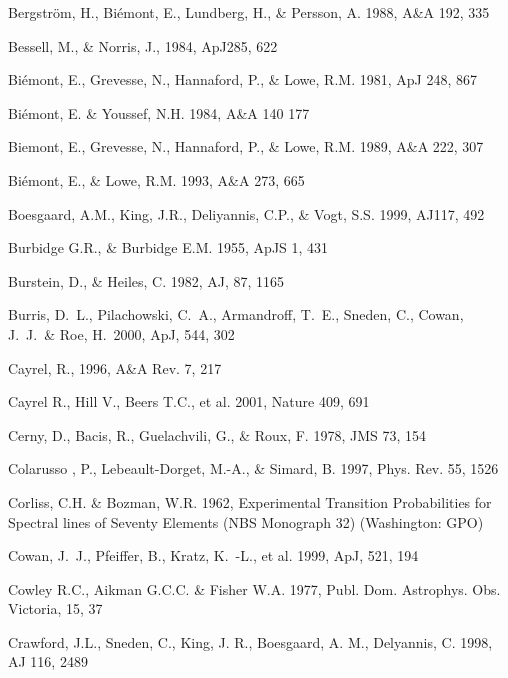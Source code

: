 \documentclass{aa}
\begin{document}
\begin{thebibliography}{}
     Bergstr\"om, H., Bi\'emont, E.,
Lundberg, H., \& Persson, A. 1988, A\&A 192, 335

    Bessell, M., \& Norris, J., 1984, ApJ285, 622

     Bi\'emont, E., Grevesse, N., Hannaford,
P., \& Lowe, R.M. 1981, ApJ 248, 867 

     Bi\'emont, E. \& Youssef, N.H. 1984, A\&A 140 177

     Biemont, E., Grevesse, N., Hannaford,
    P., \& Lowe, R.M. 1989, A\&A 222, 307 

     Bi\'emont, E., \& Lowe, R.M. 1993, A\&A 273, 665

    Boesgaard, A.M., King, J.R.,
   Deliyannis, C.P., \& Vogt, S.S. 1999, AJ117, 492

    Burbidge G.R., \& Burbidge  E.M. 1955, 
ApJS 1, 431 

     Burstein, D., \& Heiles, C. 1982, AJ, 87, 1165

     Burris, D.\ L.,
Pilachowski, C.\ A., Armandroff, T.\ E., Sneden, C., Cowan, J.\ J.\ \& Roe,
H.\ 2000, ApJ, 544, 302

     Cayrel, R., 1996, A\&A Rev. 7, 217

Cayrel R., Hill V., Beers T.C., et al. 2001, Nature 409, 691

    Cerny, D., Bacis, R., Guelachvili, G., \& Roux, F.
1978, JMS 73, 154

    Colarusso , P., Lebeault-Dorget, M.-A.,
 \&  Simard, B. 1997, Phys. Rev. 55, 1526 

     Corliss, C.H. \& Bozman, W.R. 1962, Experimental Transition
Probabilities for Spectral lines of Seventy Elements (NBS Monograph
32) (Washington: GPO)

     Cowan, J.\ J., Pfeiffer,
B., Kratz, K.\ -L., et al. 1999, ApJ, 521, 194

    Cowley R.C., Aikman G.C.C. \& Fisher W.A. 1977, 
   Publ. Dom. Astrophys. Obs. Victoria, 15, 37

    Crawford, J.L., Sneden, C., King,
   J. R., Boesgaard, A. M., Delyannis, C. 1998, AJ 116, 2489
   

\end{thebibliography}
\end{document}

